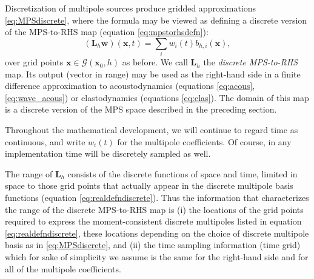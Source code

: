 Discretization of multipole sources produce gridded approximations \ref{eq:MPSdiscrete}, where the formula may be viewed as defining a discrete version of the MPS-to-RHS map (equation \ref{eq:mpstorhsdefn}):
\begin{equation} \label{eq:mpstorhsdefndiscrete}
	(\mathbf L_h \mathbf w)(\mathbf x,t) = \sum_{i} w_i(t) b_{h,i}(\mathbf x),
\end{equation}
over grid points $\mathbf x\in\mathcal G(\mathbf x_0,h)$ as before.
We call $\mathbf L_h$ the {\em discrete MPS-to-RHS} map. 
Its output (vector in range) may be used as the right-hand side in a finite difference approximation to acoustodynamics (equations \ref{eq:acous}, \ref{eq:wave_acous}) or elastodynamics (equations \ref{eq:elas}). 
The domain of this map is a discrete version of the MPS space described in the preceding section. 

 Throughout the mathematical development, we will continue to regard time as continuous, and write $w_i(t)$ for the multipole coefficients. 
Of course, in any implementation time will be discretely sampled as well.

The range of $\mathbf L_h$ consists of the discrete functions of space and time, limited in space to those grid points that actually appear in the discrete multipole basis functions (equation \ref{eq:realdefndiscrete}). 
Thus the information that characterizes the range of the discrete MPS-to-RHS map is
(i) the locations of the grid points required to express the moment-consistent discrete multipoles listed in equation \ref{eq:realdefndiscrete}, these locations depending on the choice of discrete multipole basis as in \ref{eq:MPSdiscrete}, 
and (ii) the time sampling information (time grid) which for sake of simplicity we assume is the same for the right-hand side and for all of the multipole coefficients.








